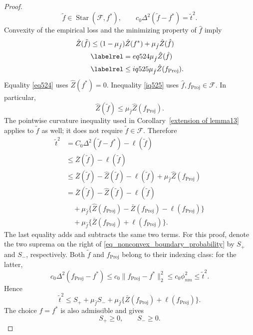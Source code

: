 \documentclass[twoside,11pt]{article}
\newenvironment{revision}{\color{revisionred}}{}
\begin{document}
\begin{revision}
\begin{proof}
\[
\tilde f\in\operatorname{Star}(\mathcal F,f^*),
\qquad c_0\Delta^2(\tilde f-f^*)=\tilde t^2.
\]
Convexity of the empirical loss and the minimizing property of
$\hat f$ imply
\begin{align*}
\hat Z(\tilde f)
&\leq(1-\mu_{\hat f})\hat Z(f^*)+\mu_{\hat f}\hat Z(\hat f)\\
&\labelrel={eq524}\mu_{\hat f}\hat Z(\hat f)\\
&\labelrel\leq{iq525}\mu_{\hat f}\hat Z(f_{\text{Proj}}).
\end{align*}
Equality \eqref{eq524} uses $\hat Z(f^*)=0$.
Inequality \eqref{iq525} uses
$\hat f,f_{\text{Proj}}\in\mathcal F$.
In particular,
\begin{equation}
\label{eq:star}
\hat Z(\tilde f)\leq\mu_{\hat f}\hat Z(f_{\text{Proj}}).
\end{equation}
The pointwise curvature inequality used in
Corollary~\ref{extension of lemma13} applies to $\tilde f$ as well;
it does not require $\tilde f\in\mathcal F$. Therefore
\begin{align*}
\tilde t^2
&=C_0\Delta^2(\tilde f-f^*)-\ell(\tilde f)\\
&\leq\bar Z(\tilde f)-\ell(\tilde f)\\
&\leq\bar Z(\tilde f)-\hat Z(\tilde f)-\ell(\tilde f)
      +\mu_{\hat f}\hat Z(f_{\text{Proj}})\\
&=\bar Z(\tilde f)-\hat Z(\tilde f)-\ell(\tilde f)\\
&\quad+\mu_{\hat f}
 \{\hat Z(f_{\text{Proj}})-\bar Z(f_{\text{Proj}})
                         -\ell(f_{\text{Proj}})\}\\
&\quad+\mu_{\hat f}
 \{\bar Z(f_{\text{Proj}})+\ell(f_{\text{Proj}})\}.
\end{align*}
The last equality adds and subtracts the same two terms.
For this proof, denote the two suprema on the right of
\eqref{eq_nonconvex_boundary_probability} by $S_+$ and $S_-$,
respectively. Both $\tilde f$ and $f_{\text{Proj}}$ belong to their
indexing class: for the latter,
\[
c_0\Delta^2(f_{\text{Proj}}-f^*)
\leq c_0\|f_{\text{Proj}}-f^*\|_2^2
\leq c_0\phi_{nm}^2\leq\tilde t^2.
\]
Hence
\begin{equation}
\label{eq:star3}
\tilde t^2\leq S_++\mu_{\hat f}S_-
+\mu_{\hat f}\{\bar Z(f_{\text{Proj}})
                  +\ell(f_{\text{Proj}})\}.
\end{equation}
The choice $f=f^*$ is also admissible and gives
\begin{equation}
\label{in138}
S_+\geq0,\qquad S_-\geq0.
\end{equation}

\end{proof}
\end{revision}
\end{document}
